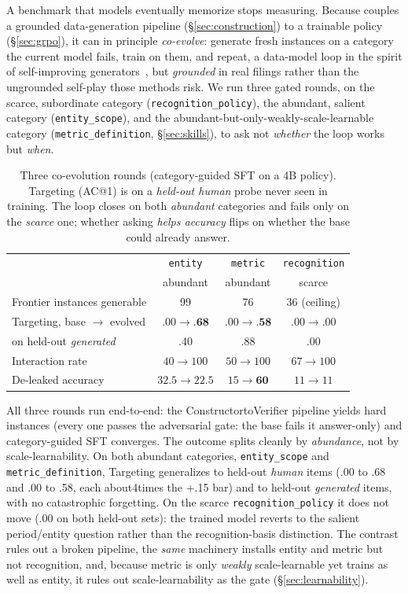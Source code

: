 A benchmark that models eventually memorize stops measuring. Because \fininteract
couples a grounded data-generation pipeline (\S\ref{sec:construction}) to a
trainable policy (\S\ref{sec:grpo}), it can in principle \emph{co-evolve}: generate
fresh instances on a category the current model fails, train on them, and repeat, a
data-model loop in the spirit of self-improving
generators~\citep{mae2025}, but \emph{grounded} in real filings rather than the
ungrounded self-play those methods risk. We run three gated rounds, on the scarce,
subordinate category (\texttt{recognition\_policy}), the abundant, salient category
(\texttt{entity\_scope}), and the abundant-but-only-weakly-scale-learnable category
(\texttt{metric\_definition}, \S\ref{sec:skills}), to ask not \emph{whether} the
loop works but \emph{when}.

\begin{table}[t]
\centering
\caption{Three co-evolution rounds (category-guided SFT on a 4B policy). Targeting
(AC@1) is on a \emph{held-out human} probe never seen in training. The loop
closes on both \emph{abundant} categories and fails only on the \emph{scarce} one; whether
asking \emph{helps accuracy} flips on whether the base could already answer.}
\label{tab:coevolve}
\small
\begin{tabular}{lccc}
\toprule
 & \texttt{entity} & \texttt{metric} & \texttt{recognition} \\
 & \footnotesize abundant & \footnotesize abundant & \footnotesize scarce \\
\midrule
Frontier instances generable        & 99 & 76 & 36 (ceiling) \\
Targeting, base $\to$ evolved        & $.00\to\textbf{.68}$ & $.00\to\textbf{.58}$ & $.00\to.00$ \\
\;\;on held-out \emph{generated}     & .40 & .88 & .00 \\
Interaction rate                     & $40\to100$ & $50\to100$ & $67\to100$ \\
De-leaked accuracy                   & $32.5\to22.5$ & $15\to\textbf{60}$ & $11\to11$ \\
\bottomrule
\end{tabular}
\end{table}

All three rounds run end-to-end: the ConstructortoVerifier pipeline yields hard
instances (every one passes the adversarial gate: the base fails it answer-only)
and category-guided SFT converges. The outcome splits cleanly by \emph{abundance}, not
by scale-learnability. On both abundant categories, \texttt{entity\_scope} and
\texttt{metric\_definition}, Targeting generalizes to held-out \emph{human} items
(.00 to .68 and .00 to .58, each about4times the +.15 bar) and to held-out
\emph{generated} items, with no catastrophic forgetting. On the scarce
\texttt{recognition\_policy} it does not move (.00 on both held-out sets): the
trained model reverts to the salient period/entity question rather than the
recognition-basis distinction. The contrast rules out a broken pipeline, the
\emph{same} machinery installs entity and metric but not recognition, and, because
metric is only \emph{weakly} scale-learnable yet trains as well as entity, it rules
out scale-learnability as the gate (\S\ref{sec:learnability}).

